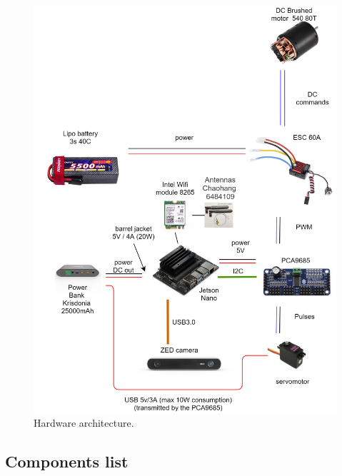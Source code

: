 		\FloatBarrier

		\begin{figure}[!htbp]
			\centering
			\includegraphics[width=1.0\columnwidth, height = 1.3\columnwidth]{imgs/hardware.png}
			\caption{Hardware architecture.}
			\label{hardwarepng}
		\end{figure}

		\FloatBarrier

		\subsection{Components list}
		
